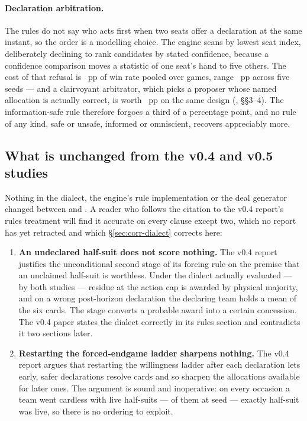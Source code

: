 \paragraph{Declaration arbitration.} The rules do not say who acts first when
two seats offer a declaration at the same instant, so the order is a modelling
choice. The engine scans by lowest seat index, deliberately declining to rank
candidates by stated confidence, because a confidence comparison moves a
statistic of one seat's hand to five others. The cost of that refusal is
\numArbCost{}~pp of win rate pooled over \numArbGames{} games, range
\numArbRange{}~pp across five seeds --- and a clairvoyant arbitrator, which
picks a proposer whose named allocation is actually correct, is worth
\numArbOracle{}~pp on the same design
(, \S\S3--4). The
information-safe rule therefore forgoes a third of a percentage point, and no
rule of any kind, safe or unsafe, informed or omniscient, recovers appreciably
more.

\subsection{What is unchanged from the v0.4 and v0.5 studies}
\label{sec:rules-unchanged}

Nothing in the dialect, the engine's rule implementation or the deal generator
changed between \vfive{} and \vsix{}. A reader who follows the citation to the
v0.4 report's rules treatment will find it accurate on every clause except two,
which no report has yet retracted and which \S\ref{sec:corr-dialect} corrects
here:

\begin{enumerate}
  \item \textbf{An undeclared half-suit does not score nothing.} The v0.4 report
        justifies the unconditional second stage of its forcing rule on the
        premise that an unclaimed half-suit is worthless. Under the dialect
        actually evaluated --- by both studies --- residue at the action cap is
        awarded by physical majority, and on a wrong post-horizon declaration
        the declaring team holds a mean \numResidueHeld{} of the six cards. The
        stage converts a probable award into a certain concession. The v0.4
        paper states the dialect correctly in its rules section and contradicts
        it two sections later.
  \item \textbf{Restarting the forced-endgame ladder sharpens nothing.} The v0.4
        report argues that restarting the willingness ladder after each
        declaration lets early, safer declarations resolve cards and so sharpen
        the allocations available for later ones. The argument is sound and
        inoperative: on every occasion a team went cardless with live half-suits
        --- \numLadderOccasions{} of them at seed \numLadderSeed{} --- exactly
        \numLadderLiveSets{} half-suit was live, so there is no ordering to
        exploit.
\end{enumerate}

